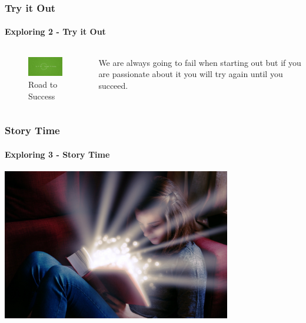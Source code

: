 \documentclass[aspectratio=169]{beamer}
\begin{document}
\begin{frame}
  \frametitle{Try it Out}
  \framesubtitle{Exploring 2 - Try it Out}
  \begin{columns}[onlytextwidth]
    \begin{column}{.30\textwidth}
      \begin{figure}
        \includegraphics[width=5.5cm,keepaspectratio]{try_fail_success}
        \caption{Road to Success}
      \end{figure}
    \end{column}
    \hfill
    \begin{column}{.60\textwidth}
        \begin{tcolorbox}[title=success.log,colback=gray]
          We are always going to fail when starting out but if you are passionate about it you will try again until you succeed.
        \end{tcolorbox}
    \end{column}
  \end{columns}
\end{frame}

\begin{frame}
  \frametitle{Story Time}
  \framesubtitle{Exploring 3 - Story Time}
  \begin{center}
    \includegraphics[width=10cm,keepaspectratio]{story_time}
  \end{center}
\end{frame}

\end{document}

